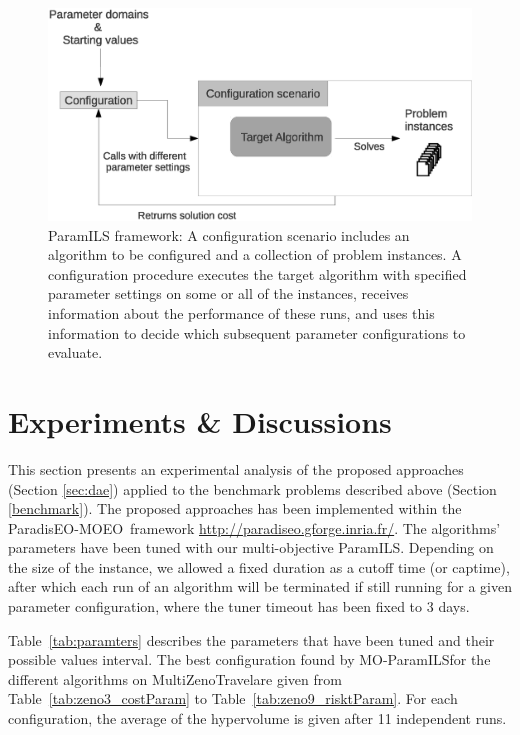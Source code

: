 \documentclass[a4paper,10pt]{article}
\def\PARADISEO{{\sc ParadisEO-MOEO}}
\def\MULTIZENO{{\sc MultiZenoTravel}}
\def \PARAMILS {{ParamILS}}
\begin{document}
\begin{figure}[h!]
 \centering
 \includegraphics[scale=0.5, bb=0 0 673 343]{./schema.eps}
 \caption{ParamILS framework: A configuration scenario includes an algorithm to be configured and a collection of problem instances.
A configuration procedure executes the target algorithm with specified parameter settings on some or all of the instances, receives information about the performance of these runs, and uses
this information to decide which subsequent parameter configurations to evaluate.}
\label{fig:paramIlsfreamwork}
\end{figure}



\section{Experiments \& Discussions}

 
This section presents an experimental analysis of the proposed approaches (Section \ref{sec:dae}) applied to the benchmark problems described above (Section \ref{benchmark}). 
The proposed approaches has been implemented within the \PARADISEO\ framework \url{http://paradiseo.gforge.inria.fr/}.
The algorithms' parameters have been tuned with our multi-objective \PARAMILS. 
Depending on the size of the instance, we allowed a fixed  duration as a cutoff time (or captime), after which each run of an algorithm will be terminated if still running for a given parameter configuration, where the tuner timeout has been fixed to 3 days.

Table~\ref{tab:paramters} describes the parameters that have been tuned and their possible values interval. 
The best configuration found by MO-\PARAMILS for  the different algorithms  on \MULTIZENO are given from Table~\ref{tab:zeno3_costParam} to Table~\ref{tab:zeno9_risktParam}.
For each configuration, the average of the hypervolume is given after 11 independent runs.
\end{document}

